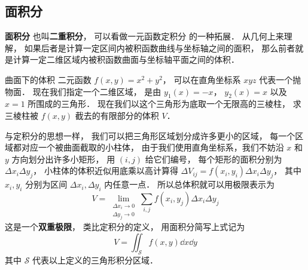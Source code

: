 
\subsection{面积分}
\textbf{面积分} 也叫\textbf{二重积分}， 可以看做一元函数定积分 的一种拓展． 从几何上来理解， 如果后者是计算一定区间内被积函数曲线与坐标轴之间的面积， 那么前者就是计算一定二维区域内被积函数曲面与坐标轴平面之间的体积．

\begin{example}{曲面下的体积}\label{IntN_ex1}
二元函数 $f(x,y) = x^2 + y^2$， 可以在直角坐标系 $xyz$ 代表一个抛物面． 现在我们指定一个二维区域， 是由 $y_1(x) = -x$， $y_2(x) = x$ 以及 $x = 1$ 所围成的三角形． 现在我们以这个三角形为底取一个无限高的三棱柱， 求三棱柱被 $f(x,y)$ 截去的有限部分的体积 $V$．

与定积分的思想一样， 我们可以把三角形区域划分成许多更小的区域， 每一个区域都对应一个被曲面截取的小柱体， 由于我们使用直角坐标系，我们不妨沿 $x$ 和 $y$ 方向划分出许多小矩形， 用 $(i,j)$ 给它们编号， 每个矩形的面积分别为 $\Delta x_i \Delta y_j$， 小柱体的体积近似用底乘以高计算得 $\Delta V_{ij} = f(x_i,y_i) \Delta x_i \Delta y_j$， 其中 $x_i, y_i$ 分别为区间 $\Delta x_i, \Delta y_i$ 内任意一点． 所以总体积就可以用极限表示为
\begin{equation}\label{IntN_eq1}
V = \lim_{\substack{\Delta x_i\to 0\\ \Delta y_j\to 0}} \sum_{i, j} f(x_i,y_j) \Delta x_i \Delta y_j
\end{equation}
这是一个\textbf{双重极限}， 类比定积分的定义， 用面积分简写上式记为
\begin{equation}
V = \iint_{\mathcal{S}} f(x,y) \dd{x}\dd{y}
\end{equation}
其中 $\mathcal{S}$ 代表以上定义的三角形积分区域． 


\end{example}
